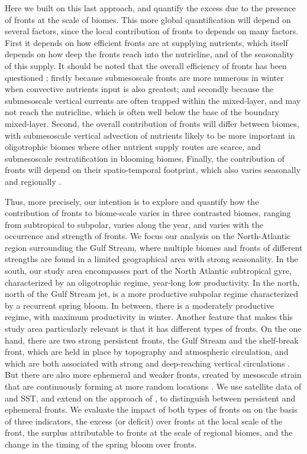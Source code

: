 Here we built on this last approach, and quantify the excess  due to the presence of fronts at the scale of biomes.
This more global quantification will depend on several factors, since the local contribution of fronts to  depends on many factors.
First it depends on how efficient fronts are at supplying nutrients, which itself depends on how deep the fronts reach into the nutricline, and of the seasonality of this supply.
It should be noted that the overall efficiency of fronts has been questioned \citep{levy_2018}; firstly because submesoscale fronts are more numerous in winter when convective nutrients input is also greatest; and secondly because the submesoscale vertical currents are often trapped within the mixed-layer, and may not reach the nutricline, which is often well below the base of the boundary mixed-layer.
Second, the overall contribution of fronts will differ between biomes, with submesoscale vertical advection of nutrients likely to be more important in oligotrophic biomes where other nutrient supply routes are scarce, and submesoscale restratification in blooming biomes.
Finally, the contribution of fronts will depend on their spatio-temporal footprint, which also varies seasonally \citep{callies_2015} and regionally \citep{mauzole_2022}.

Thus, more precisely, our intention is to explore and quantify how the contribution of fronts to biome-scale  varies in three contrasted biomes, ranging from subtropical to subpolar, varies along the year, and varies with the occurrence and strength of fronts.
We focus our analysis on the North-Atlantic region surrounding the Gulf Stream, where multiple biomes and fronts of different strengths are found in a limited geographical area \citep{bock_2022} with strong seasonality.
In the south, our study area encompasses part of the North Atlantic subtropical gyre, characterized by an oligotrophic regime, year-long low productivity.
In the north, north of the Gulf Stream jet, is a more productive subpolar regime characterized by a recurrent spring bloom.
In between, there is a moderately productive regime, with maximum productivity in winter.
Another feature that makes this study area particularly relevant is that it has different types of fronts.
On the one hand, there are two strong persistent fronts, the Gulf Stream and the shelf-break front, which are held in place by topography and atmospheric circulation, and which are both associated with strong and deep-reaching vertical circulations \citep{flagg_2006, liao_2022}.
But there are also more ephemeral and weaker fronts, created by mesoscale strain that are continuously forming at more random locations \citep{drushka_2019, sanchez-rios_2020}.
We use satellite data of  and SST, and extend on the approach of \citet{liu_2016}, to distinguish between persistent and ephemeral fronts.
We evaluate the impact of both types of fronts on  on the basis of three indicators, the excess (or deficit)  over fronts at the local scale of the front, the surplus  attributable to fronts at the scale of regional biomes, and the change in the timing of the  spring bloom over fronts.


